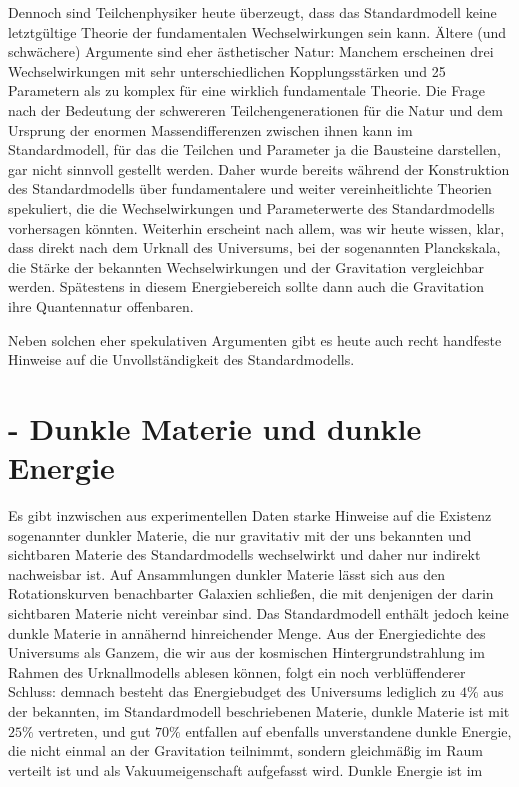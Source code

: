 \documentclass[10pt, letterpaper]{article}
\begin{document}
Dennoch sind Teilchenphysiker heute überzeugt, dass das Standardmodell keine letztgültige Theorie der fundamentalen Wechselwirkungen sein kann. Ältere (und schwächere) Argumente sind eher ästhetischer Natur: Manchem erscheinen drei Wechselwirkungen mit sehr unterschiedlichen Kopplungsstärken und 25 Parametern als zu komplex für eine wirklich fundamentale Theorie. Die Frage nach der Bedeutung der schwereren Teilchengenerationen für die Natur und dem Ursprung der enormen Massendifferenzen zwischen ihnen kann im Standardmodell, für das die Teilchen und Parameter ja die Bausteine darstellen, gar nicht sinnvoll gestellt werden. Daher wurde bereits während der Konstruktion des Standardmodells über fundamentalere und weiter vereinheitlichte Theorien spekuliert, die die Wechselwirkungen und Parameterwerte des Standardmodells vorhersagen könnten. Weiterhin erscheint nach allem, was wir heute wissen, klar, dass direkt nach dem Urknall des Universums, bei der sogenannten Planckskala, die Stärke der bekannten Wechselwirkungen und der Gravitation vergleichbar werden. Spätestens in diesem Energiebereich sollte dann auch die Gravitation ihre Quantennatur offenbaren.

Neben solchen eher spekulativen Argumenten gibt es heute auch recht handfeste Hinweise auf die Unvollständigkeit des Standardmodells.

\section*{- Dunkle Materie und dunkle Energie}
Es gibt inzwischen aus experimentellen Daten starke Hinweise auf die Existenz sogenannter dunkler Materie, die nur gravitativ mit der uns bekannten und sichtbaren Materie des Standardmodells wechselwirkt und daher nur indirekt nachweisbar ist. Auf Ansammlungen dunkler Materie lässt sich aus den Rotationskurven benachbarter Galaxien schließen, die mit denjenigen der darin sichtbaren Materie nicht vereinbar sind. Das Standardmodell enthält jedoch keine dunkle Materie in annähernd hinreichender Menge. Aus der Energiedichte des Universums als Ganzem, die wir aus der kosmischen Hintergrundstrahlung im Rahmen des Urknallmodells ablesen können, folgt ein noch verblüffenderer Schluss: demnach besteht das Energiebudget des Universums lediglich zu $4 \%$ aus der bekannten, im Standardmodell beschriebenen Materie, dunkle Materie ist mit $25 \%$ vertreten, und gut $70 \%$ entfallen auf ebenfalls unverstandene dunkle Energie, die nicht einmal an der Gravitation teilnimmt, sondern gleichmäßig im Raum verteilt ist und als Vakuumeigenschaft aufgefasst wird. Dunkle Energie ist im
\end{document}
